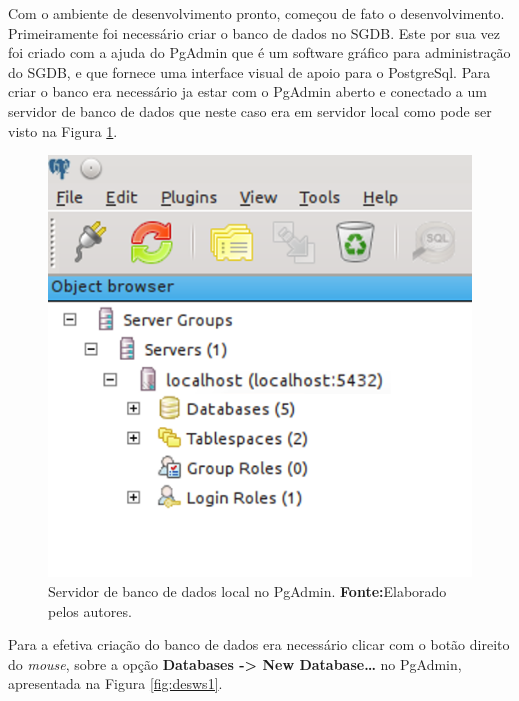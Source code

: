 
	\par Com o ambiente de desenvolvimento pronto, começou de fato o
desenvolvimento. Primeiramente foi necessário criar o banco de dados no SGDB.
Este por sua vez foi criado com a ajuda do PgAdmin que é um software gráfico
para administração do SGDB, e que fornece uma interface visual de apoio para o
PostgreSql. Para criar o banco era necessário ja estar com o PgAdmin aberto e
conectado a um servidor de banco de dados que neste caso era em servidor local como pode
ser visto na Figura \ref{fig:desws}.

	\begin{figure}[h!]
		\centerline{\includegraphics[scale=0.5]{./imagens/2_q_metodologico/4_procedimentos_resultados/43_webservice/432_desenvolvimento/desws.png}}
		\caption[Servidor de banco de dados local no PgAdmin]{Servidor de banco de
		dados local no PgAdmin.
			\textbf{Fonte:}Elaborado pelos autores.}
		\label{fig:desws}
	\end{figure}
	
	\par Para a efetiva criação do banco de dados era necessário clicar com o
botão direito do \textit{mouse}, sobre a opção \textbf{Databases -> New
Database\ldots} no PgAdmin, apresentada na Figura \ref{fig:desws1}.

